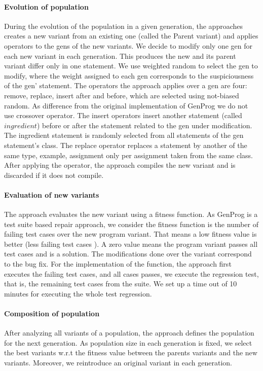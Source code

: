 \documentclass[11pt]{article} %
\begin{document}
\paragraph{Evolution of population}
During the evolution of the population in a given generation, 
the approaches creates a new variant from an existing one (called the Parent variant) and applies operators to the  gens of the new variants.
We decide to modify only one gen for each new variant in each generation.
This produces the new and its parent variant differ only in one statement.
We use weighted random to select the gen to modify, where the weight assigned to each gen corresponds to the suspiciousness of the gen' statement.
The operators the approach applies over a gen are four: 
remove, replace, insert after and before, which are selected using not-biased random. 
As difference from the original implementation of GenProg \cite{weimer2009automatically} we do not use crossover operator. 
The insert operators  insert another statement (called $ingredient$)  before or after the statement related to the gen under modification.  
The ingredient statement is randomly selected from all statements of the  gen  statement's class.
The replace operator  replaces a statement by another of the same type, example, assignment only per assignment taken from the same class. 
After applying the operator, the approach compiles the new variant and is discarded if it does not compile. 

\paragraph{Evaluation of new variants}
The approach evaluates the new variant using a fitness function.
As GenProg is a test suite based repair approach, we consider the fitness function is the number of failing test cases over the new program variant. 
That means a low fitness value is better (less failing test cases ).
A zero value means the program variant passes all test cases and is a solution. The modifications done over the variant correspond to the bug fix. 
For the implementation of the function, the approach first executes the failing test cases, and all cases passes, we execute the regression test, that is, the remaining test cases from the suite. 
We set up a time out of 10 minutes for executing the whole test regression.


\paragraph{Composition of population}
After analyzing all variants of a population, the approach defines the population for the next generation.
As population size in each generation is fixed, 
we select the best variants w.r.t the fitness value between the parents variants and the new variants.
Moreover, we reintroduce an original variant in each generation. 
\end{document}
